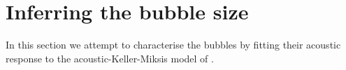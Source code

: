 



\section{Inferring the bubble size}\label{sec:exp:modelling}

In this section we attempt to characterise the bubbles by fitting their acoustic response to the acoustic-Keller-Miksis model of .


